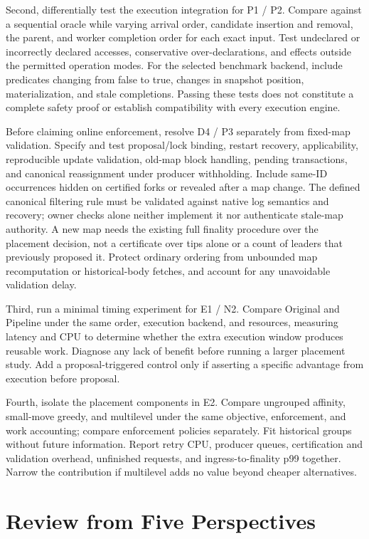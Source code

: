 \documentclass[11pt]{article}
\begin{document}
Second, differentially test the execution integration for P1 / P2. Compare against a sequential oracle while varying arrival order, candidate insertion and removal, the parent, and worker completion order for each exact input. Test undeclared or incorrectly declared accesses, conservative over-declarations, and effects outside the permitted operation modes. For the selected benchmark backend, include predicates changing from false to true, changes in snapshot position, materialization, and stale completions. Passing these tests does not constitute a complete safety proof or establish compatibility with every execution engine.

Before claiming online enforcement, resolve D4 / P3 separately from fixed-map validation. Specify and test proposal/lock binding, restart recovery, applicability, reproducible update validation, old-map block handling, pending transactions, and canonical reassignment under producer withholding. Include same-ID occurrences hidden on certified forks or revealed after a map change. The defined canonical filtering rule must be validated against native log semantics and recovery; owner checks alone neither implement it nor authenticate stale-map authority. A new map needs the existing full finality procedure over the placement decision, not a certificate over tips alone or a count of leaders that previously proposed it. Protect ordinary ordering from unbounded map recomputation or historical-body fetches, and account for any unavoidable validation delay.

Third, run a minimal timing experiment for E1 / N2. Compare Original and Pipeline under the same order, execution backend, and resources, measuring latency and CPU to determine whether the extra execution window produces reusable work. Diagnose any lack of benefit before running a larger placement study. Add a proposal-triggered control only if asserting a specific advantage from execution before proposal.

Fourth, isolate the placement components in E2. Compare ungrouped affinity, small-move greedy, and multilevel under the same objective, enforcement, and work accounting; compare enforcement policies separately. Fit historical groups without future information. Report retry CPU, producer queues, certification and validation overhead, unfinished requests, and ingress-to-finality p99 together. Narrow the contribution if multilevel adds no value beyond cheaper alternatives.

\section{Review from Five Perspectives}
\end{document}
